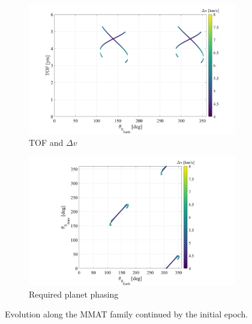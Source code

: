 \begin{figure}[ht]
    \begin{subfigure}[h]{0.495\linewidth}
        \includegraphics[width=\textwidth]{figures/MMATTOF.pdf}
        \caption{TOF and $\Delta v$}
    \end{subfigure}
    \hfill
    \begin{subfigure}[h]{0.495\linewidth}
        \includegraphics[width=\textwidth]{figures/MMATtheta.pdf}
        \caption{Required planet phasing}
    \end{subfigure}
    \caption{Evolution along the MMAT family continued by the initial epoch.}
    \label{fig:MMATEvo}
\end{figure}

